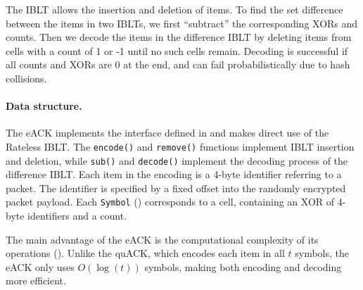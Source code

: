 The IBLT allows the insertion and deletion of items. To find the set difference
between the items in two IBLTs, we first ``subtract'' the corresponding XORs
and counts. Then we decode the items in the difference IBLT by deleting items
from cells with a count of 1 or -1 until no such cells remain. Decoding is
successful if all counts and XORs are 0 at the end, and can fail
probabilistically due to hash collisions.



\paragraph{Data structure.}


The eACK implements
the interface defined in  and makes direct use of the Rateless IBLT.
The \texttt{encode()} and \texttt{remove()} functions implement IBLT insertion
and deletion, while \texttt{sub()} and \texttt{decode()} implement
the decoding process of the difference IBLT.
Each item in the encoding is a 4-byte identifier referring to a packet. The
identifier is specified by a fixed offset into the randomly encrypted packet
payload. Each \texttt{Symbol} () corresponds to a
cell, containing an XOR of 4-byte identifiers and a count.

The main advantage of the eACK is the computational complexity of its
operations (). Unlike the quACK,
which encodes each item in all $t$ symbols, the eACK only uses
$O(\log(t))$ symbols, making both encoding and decoding more efficient.



